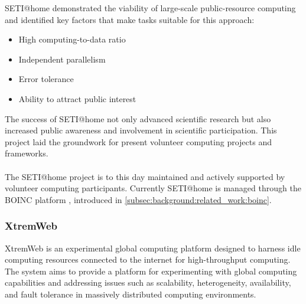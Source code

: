 \ac{SETI}@home demonstrated the viability of large-scale public-resource computing and identified key factors that make tasks suitable for this approach:
\begin{itemize}
  \item High computing-to-data ratio
  \item Independent parallelism
  \item Error tolerance
  \item Ability to attract public interest
\end{itemize}
The success of \ac{SETI}@home not only advanced scientific research but also increased public awareness and involvement in scientific participation. This project laid the groundwork for present volunteer computing projects and frameworks. \cite{relatedwork:seti}
\\~\\
The \ac{SETI}@home project is to this day maintained and actively supported by volunteer computing participants. Currently \ac{SETI}@home is managed through the \acs{BOINC} platform \cite{relatedwork:boinc1}, introduced in \autoref{subsec:background:related_work:boinc}.

\subsubsection{XtremWeb}
\label{subsec:background:related_work:xtremweb}
XtremWeb is an experimental global computing platform designed to harness idle computing resources connected to the internet for high-throughput computing. The system aims to provide a platform for experimenting with global computing capabilities and addressing issues such as scalability, heterogeneity, availability, and fault tolerance in massively distributed computing environments. \cite{relatedwork:xtremweb}

